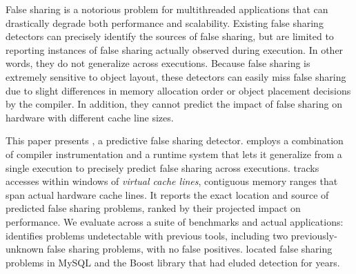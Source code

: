 
\begin{comment}
... performance degradation in multithreaded
programs. It apprears when two or more threads running on different cores periodically access 
different portions of data that can fit into one cache line. Since caching
system in a multicore processor needs to ensure a coherent view of memory
accross all cores, it has to grant an exclusive access
for each write operation by invidating duplicate copies in other cores. As a
result, frequent cache invalidation can seriously affect the scalability and
performance of multithreaded programs.
\end{comment} 

False sharing is a notorious problem for multithreaded applications
that can drastically degrade both performance and
scalability. Existing false sharing detectors can precisely identify
the sources of false sharing, but are limited to reporting instances
of false sharing actually observed during execution. In other words,
they do not generalize across executions. Because false sharing is
extremely sensitive to object layout, these detectors can easily miss
false sharing due to slight differences in memory allocation order or
object placement decisions by the compiler. In addition, they cannot
predict the impact of false sharing on hardware with different cache
line sizes.


This paper presents \Predator{}, a predictive false sharing
detector. \Predator{} employs a combination of compiler
instrumentation and a runtime system that lets it generalize from a
single execution to precisely predict false sharing across executions.
\predator{} tracks accesses within windows of \emph{virtual cache
  lines}, contiguous memory ranges that span actual hardware
cache lines. It reports the exact location and source of predicted
false sharing problems, ranked by their projected impact on
performance. We evaluate \Predator{} across a suite of benchmarks and
actual applications: \Predator{} identifies problems undetectable with
previous tools, including two previously-unknown false sharing
problems, with no false positives. \Predator{} located false sharing
problems in MySQL and the Boost library that had
eluded detection for years.

